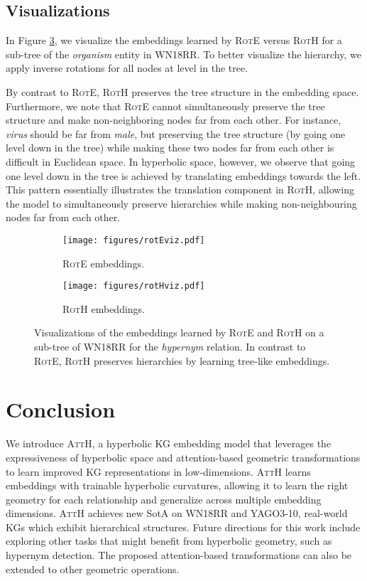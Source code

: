 \documentclass[11pt,a4paper]{article}
\newcommand{\model}[1]{\textsc{AttH}}
\begin{document}
\subsection{Visualizations}
In Figure \ref{fig:viz}, we visualize the embeddings learned by \textsc{RotE} versus \textsc{RotH} for a sub-tree of the \textit{organism} entity in WN18RR.
To better visualize the hierarchy, we apply  inverse rotations for all nodes at level  in the tree.

By contrast to \textsc{RotE}, \textsc{RotH} preserves the tree structure in the embedding space.
Furthermore, we note that \textsc{RotE} cannot simultaneously preserve the tree structure and make non-neighboring nodes far from each other. 
For instance, \textit{virus} should be far from \textit{male}, but preserving the tree structure (by going one level down in the tree) while making these two nodes far from each other is difficult in Euclidean space. 
In hyperbolic space, however, we observe that going one level down in the tree is achieved by translating embeddings towards the left. 
This pattern essentially illustrates the translation component in \textsc{RotH}, allowing the model to simultaneously preserve hierarchies while making non-neighbouring nodes far from each other.  \begin{figure}[t]
\centering
\begin{subfigure}[b]{0.49\textwidth}
        \texttt{[image: figures/rotEviz.pdf]}
        \caption{\textsc{RotE} embeddings.}
        \label{fig:vizrotE}
    \end{subfigure}
    \begin{subfigure}[b]{0.49\textwidth}
        \texttt{[image: figures/rotHviz.pdf]}
        \caption{\textsc{RotH} embeddings.}
        \label{fig:vizrotH}
    \end{subfigure}
\caption{Visualizations of the embeddings learned by \textsc{RotE} and \textsc{RotH} on a sub-tree of WN18RR for the \textit{hypernym} relation.
In contrast to \textsc{RotE}, \textsc{RotH} preserves hierarchies by learning tree-like embeddings. }\label{fig:viz}
\end{figure} 
 
\section{Conclusion}
We introduce \model{}, a hyperbolic KG embedding model that leverages the expressiveness of hyperbolic space and attention-based geometric transformations to learn improved KG representations in low-dimensions.  
\model{} learns embeddings with trainable hyperbolic curvatures, allowing it to learn the right geometry for each relationship and generalize across multiple embedding dimensions. 
\model{} achieves new SotA on WN18RR and YAGO3-10, real-world KGs which exhibit hierarchical structures. 
Future directions for this work include exploring other tasks that might benefit from hyperbolic geometry, such as hypernym detection. 
The proposed attention-based transformations can also be extended to other geometric operations. 
\end{document}
